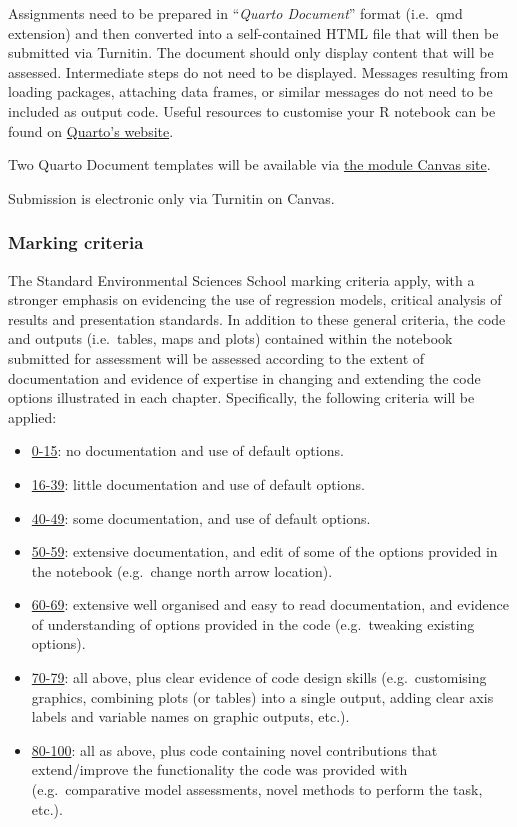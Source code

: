 \documentclass[
  letterpaper,
  DIV=11,
  numbers=noendperiod]{scrreprt}
\providecommand{\tightlist}{%
  \setlength{\itemsep}{0pt}\setlength{\parskip}{0pt}}\usepackage{longtable,booktabs,array}
\begin{document}
Assignments need to be prepared in ``\emph{Quarto Document}'' format
(i.e.~qmd extension) and then converted into a self-contained HTML file
that will then be submitted via Turnitin. The document should only
display content that will be assessed. Intermediate steps do not need to
be displayed. Messages resulting from loading packages, attaching data
frames, or similar messages do not need to be included as output code.
Useful resources to customise your R notebook can be found on
\href{https://quarto.org/docs/guide/}{Quarto's website}.

Two Quarto Document templates will be available via
\href{https://canvas.liverpool.ac.uk/courses/70394/modules}{the module
Canvas site}.

Submission is electronic only via Turnitin on Canvas.

\hypertarget{marking-criteria}{%
\subsubsection{Marking criteria}\label{marking-criteria}}

The Standard Environmental Sciences School marking criteria apply, with
a stronger emphasis on evidencing the use of regression models, critical
analysis of results and presentation standards. In addition to these
general criteria, the code and outputs (i.e.~tables, maps and plots)
contained within the notebook submitted for assessment will be assessed
according to the extent of documentation and evidence of expertise in
changing and extending the code options illustrated in each chapter.
Specifically, the following criteria will be applied:

\begin{itemize}
\tightlist
\item
  \ul{0-15}: no documentation and use of default options.
\item
  \ul{16-39}: little documentation and use of default options.
\item
  \ul{40-49}: some documentation, and use of default options.
\item
  \ul{50-59}: extensive documentation, and edit of some of the options
  provided in the notebook (e.g.~change north arrow location).
\item
  \ul{60-69}: extensive well organised and easy to read documentation,
  and evidence of understanding of options provided in the code
  (e.g.~tweaking existing options).
\item
  \ul{70-79}: all above, plus clear evidence of code design skills
  (e.g.~customising graphics, combining plots (or tables) into a single
  output, adding clear axis labels and variable names on graphic
  outputs, etc.).
\item
  \ul{80-100}: all as above, plus code containing novel contributions
  that extend/improve the functionality the code was provided with
  (e.g.~comparative model assessments, novel methods to perform the
  task, etc.).
\end{itemize}
\end{document}
